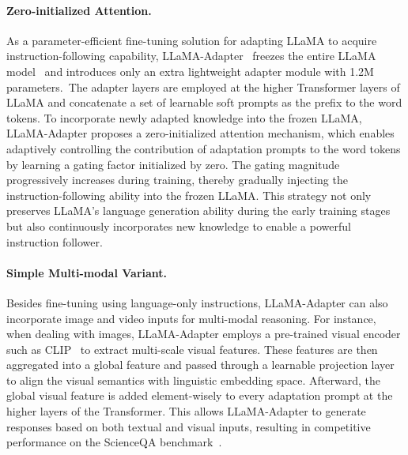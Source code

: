 \documentclass[10pt,twocolumn,letterpaper]{article}
\begin{document}
\paragraph{Zero-initialized Attention.}
As a parameter-efficient fine-tuning solution for adapting LLaMA to acquire instruction-following capability, LLaMA-Adapter~\cite{llamaadapter2023} freezes the entire LLaMA model~\cite{touvron2023llama} and introduces only an extra lightweight adapter module with 1.2M parameters.~The adapter layers are employed at the higher Transformer layers of LLaMA and concatenate a set of learnable soft prompts as the prefix to the word tokens. To incorporate newly adapted knowledge into the frozen LLaMA, LLaMA-Adapter proposes a zero-initialized attention mechanism, which enables adaptively controlling the contribution of adaptation prompts to the word tokens by learning a gating factor initialized by zero.
The gating magnitude progressively increases during training, thereby gradually injecting the instruction-following ability into the frozen LLaMA.
This strategy not only preserves LLaMA's language generation ability during the early training stages but also continuously incorporates new knowledge to enable a powerful instruction follower.





\paragraph{Simple Multi-modal Variant.}
Besides fine-tuning using language-only instructions, LLaMA-Adapter can also incorporate image and video inputs for multi-modal reasoning. For instance, when dealing with images, LLaMA-Adapter employs a pre-trained visual encoder such as CLIP~\cite{radford2021learning} to extract multi-scale visual features.
These features are then aggregated into a global feature and passed through a learnable projection layer to align the visual semantics with linguistic embedding space. Afterward, the global visual feature is added element-wisely to every adaptation prompt at the higher layers of the Transformer. 
This allows LLaMA-Adapter to generate responses based on both textual and visual inputs, resulting in competitive performance on the ScienceQA benchmark~\cite{scienceqa}.
\end{document}
